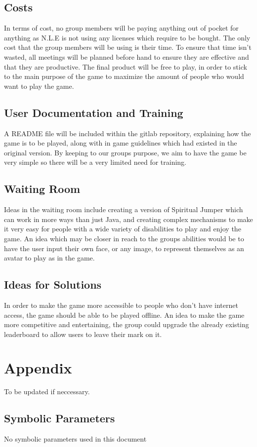 \documentclass[12pt, titlepage]{article}
\begin{document}
\subsection{Costs}

In terms of cost, no group members will be paying anything out of pocket for anything as N.L.E is not using any licenses which require to be bought. The only cost that the group members will be using is their time. To ensure that time isn't wasted, all meetings will be planned before hand to ensure they are effective and that they are productive. The final product will be free to play, in order to stick to the main purpose of the game to maximize the amount of people who would want to play the game.

\subsection{User Documentation and Training}

A README file will be included within the gitlab repository, explaining how the game is to be played, along with in game guidelines which had existed in the original version. By keeping to our groups purpose, we aim to have the game be very simple so there will be a very limited need for training. 

\subsection{Waiting Room}

Ideas in the waiting room include creating a version of Spiritual Jumper which can work in more ways than just Java, and creating complex mechanisms to make it very easy for people with a wide variety of disabilities to play and enjoy the game. An idea which may be closer in reach to the groups abilities would be to have the user input their own face, or any image, to represent themselves as an avatar to play as in the game.

\subsection{Ideas for Solutions}

In order to make the game more accessible to people who don't have internet access, the game should be able to be played offline. An idea to make the game more competitive and entertaining, the group could upgrade the already existing leaderboard to allow users to leave their mark on it. 





\newpage

\section{Appendix}

To be updated if neccessary.

\subsection{Symbolic Parameters}
No symbolic parameters used in this document
\end{document}
